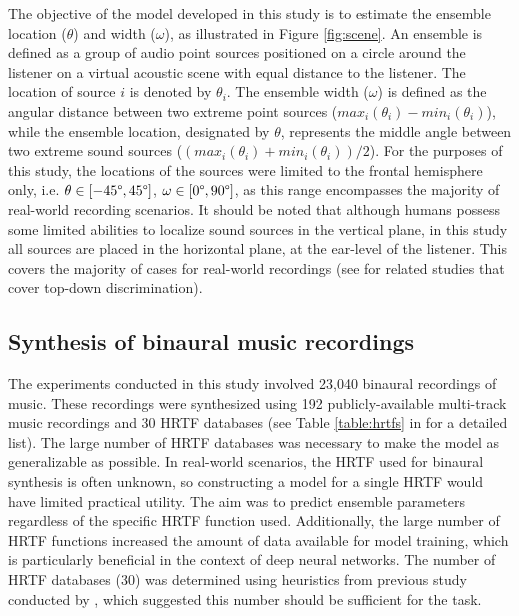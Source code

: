 \documentclass[11pt]{article}
\begin{document}
The objective of the model developed in this study is to estimate the ensemble location ($\theta$) and width ($\omega$), as illustrated in Figure \ref{fig:scene}. An ensemble is defined as a group of audio point sources positioned on a circle around the listener on a virtual acoustic scene with equal distance to the listener. The location of source $i$ is denoted by $\theta_i$. The ensemble width ($\omega$) is defined as the angular distance between two extreme point sources ($max_i(\theta_i)-min_i(\theta_i)$), while the ensemble location, designated by $\theta$, represents the middle angle between two extreme sound sources ($(max_i(\theta_i)+min_i(\theta_i))/2$). For the purposes of this study, the locations of the sources were limited to the frontal hemisphere only, i.e. $\theta\in[-45\degree, 45\degree]$, $\omega\in[0\degree, 90\degree]$, as this range encompasses the majority of real-world recording scenarios. It should be noted that although humans possess some limited abilities to localize sound sources in the vertical plane, in this study all sources are placed in the horizontal plane, at the ear-level of the listener. This covers the majority of cases for real-world recordings (see \textcite{ma_robust_2018, zielinski_spatial_2022} for related studies that cover top-down discrimination).

\subsection{Synthesis of binaural music recordings}
\label{subsec:synthesis}

The experiments conducted in this study involved 23,040 binaural recordings of music. These recordings were synthesized using 192 publicly-available multi-track music recordings \parencite{senior_mixing_2023} and 30 HRTF databases (see Table \ref{table:hrtfs} in  for a detailed list). The large number of HRTF databases was necessary to make the model as generalizable as possible. In real-world scenarios, the HRTF used for binaural synthesis is often unknown, so constructing a model for a single HRTF would have limited practical utility. The aim was to predict ensemble parameters regardless of the specific HRTF function used. Additionally, the large number of HRTF functions increased the amount of data available for model training, which is particularly beneficial in the context of deep neural networks. The number of HRTF databases (30) was determined using heuristics from previous study conducted by \textcite{zielinski_automatic_2022}, which suggested this number should be sufficient for the task.
\end{document}
